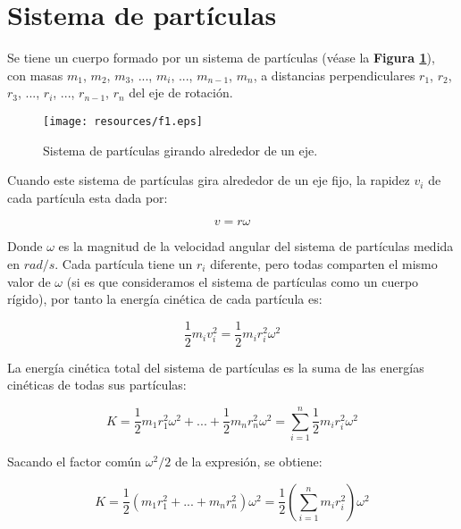 \documentclass[letter,11pt]{article}
\begin{document}
\section{Sistema de partículas\cite{Sears}}
Se tiene un cuerpo formado por un sistema de partículas (véase la \textbf{Figura
\ref{figura1}}), con masas $m_1$, $m_2$, $m_3$, ..., $m_i$, ..., $m_{n-1}$,
$m_n$, a distancias perpendiculares $r_1$, $r_2$, $r_3$, ..., $r_i$, ...,
$r_{n-1}$, $r_n$ del eje de rotación.

\begin{figure}
\centering
\texttt{[image: resources/f1.eps]}
\caption{Sistema de partículas girando alrededor de un eje.}
\label{figura1}
\end{figure}

Cuando este sistema de partículas gira alrededor de un eje fijo, la rapidez
$v_i$ de cada partícula esta dada por:

\begin{equation*}
    v = r \omega
\label{velocidad}
\end{equation*}

Donde $\omega$ es la magnitud de la velocidad angular del sistema de partículas
medida en $rad/s$. Cada partícula tiene un $r_i$ diferente, pero todas comparten
el mismo valor de $\omega$ (si es que consideramos el sistema de partículas como
un cuerpo rígido), por tanto la energía cinética de cada partícula es:

\begin{equation*}
    \frac{1}{2} m_i v^2_i = \frac{1}{2} m_i r^2_i \omega^2
\label{cinetica}
\end{equation*}

La energía cinética total del sistema de partículas es la suma de las energías
cinéticas de todas sus partículas:

\begin{equation*}
    K = \frac{1}{2} m_1 r^2_1 \omega^2 + ... + \frac{1}{2} m_n r^2_n \omega^2 = \sum_{i=1}^{n} \frac{1}{2} m_i r^2_i \omega^2
\label{cineticatotal1}
\end{equation*}

Sacando el factor común $\omega^2/2$ de la expresión, se obtiene:

\begin{equation*}
    K = \frac{1}{2} (m_1 r^2_1 + ... + m_n r^2_n ) \omega^2 = \frac{1}{2} \left( \sum_{i=1}^{n} m_i r^2_i \right) \omega^2
\label{cineticatotal2}
\end{equation*}
\end{document}

